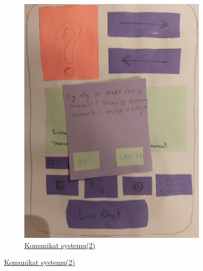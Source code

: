 \documentclass[12pt]{article}
\begin{document}
\begin{figure}[h!]
\begin{subfigure}[ba]{1\linewidth}
	\includegraphics[width=\linewidth]{zdj/5.jpg}
	\caption{\underline{Komunikat systemu(2)}}
\end{subfigure}
\end{figure}
\end{document}
